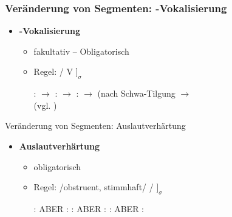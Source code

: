 \begin{frame}
\frametitle{Veränderung von Segmenten: \textipa{/\textscr /}-Vokalisierung}

\begin{itemize}
	\item \textbf{\textipa{/{\textscr}/}-Vokalisierung}
	
	\begin{itemize}
		\item fakultativ -- Obligatorisch
		\item Regel: \textipa{/{\textscr}/} \ras \textipa{[5]} / V\underline{\quad} $]_\sigma$

	\eal
		\ex {}:  $\rightarrow$ \textipa{[Po:5]}
		\ex {}:  $\rightarrow$ \textipa{[fE5n]}
		\ex {}:  $\rightarrow$ \textipa{[le:.{\textscr}@5]} (nach Schwa-Tilgung $\rightarrow$ \textipa{[le:.{\textscr}5]}\\
		(vgl.  )
	\zl
	
	\end{itemize}

\end{itemize}

\end{frame}


\begin{frame}{Veränderung von Segmenten: Auslautverhärtung}

\begin{itemize}
	\item \textbf{Auslautverhärtung}

	\begin{itemize}
		\item obligatorisch
		\item Regel: /obstruent, stimmhaft/  / \underline{\quad} $]_\sigma$

	\eal
		\ex {}:  \ras \textipa{[ba:t]}
		\ex ABER :  \ras \textipa{[bE:.d5]}
		\ex {}:  \ras \textipa{[Po.li:f]}
		\ex ABER :  \ras \textipa{[Po.li:.v@]}
		\ex {}:  \ras {}
		\ex ABER :  \ras \textipa{[PEn.d@]}
	\zl
	
	\end{itemize}

\end{itemize}

\end{frame}


